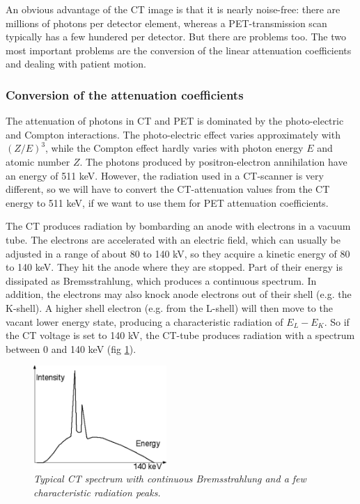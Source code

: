 An obvious advantage of the CT image is that it is nearly noise-free:
there are millions of photons per detector element, whereas a
PET-transmission scan typically has a few hundered per detector. But
there are problems too. The two most important problems are the
conversion of the linear attenuation coefficients and dealing with
patient motion.

\subsubsection{Conversion of the attenuation coefficients}
The attenuation of photons in CT and PET is dominated by the photo-electric and
Compton interactions. The photo-electric effect varies approximately with
$(Z/E)^3$, while the Compton effect hardly varies with photon energy $E$ and
atomic number $Z$. The photons produced by positron-electron annihilation have
an energy of 511 keV. However, the radiation used in a CT-scanner is very
different, so we will have to convert the CT-attenuation values from the CT
energy to 511 keV, if we want to use them for PET attenuation coefficients.

The CT produces radiation by bombarding an anode with electrons in a vacuum
tube. The electrons are accelerated with an electric field, which can usually
be adjusted in a range of about 80 to 140 kV, so they acquire a kinetic energy
of 80 to 140 keV. They hit the anode where they are stopped. Part of their
energy is dissipated as Bremsstrahlung, which produces a continuous spectrum.
In addition, the electrons may also knock anode electrons out of their shell
(e.g. the K-shell). A higher shell electron (e.g. from the L-shell) will then
move to the vacant lower energy state, producing a characteristic radiation of
$E_L - E_K$. So if the CT voltage is set to 140 kV, the CT-tube produces
radiation with a spectrum between 0 and 140 keV (fig \ref{fig:ctspectrum}).
%
\begin{figure}[tbp]
\centering
\includegraphics[width=0.45\textwidth]{figs/fig_ctspectrum.pdf}
\caption{\label{fig:ctspectrum} \emph{Typical CT spectrum with continuous
Bremsstrahlung and a few characteristic radiation peaks.}}
\end{figure}

